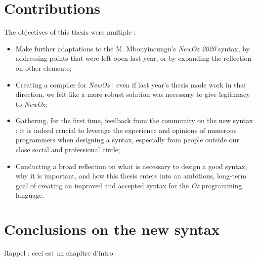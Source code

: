 \section{Contributions}\label{sec:ch1-3}
The objectives of this thesis were multiple :
\begin{itemize}
    \item Make further adaptations to the M. Mbonyincungu's \textit{NewOz 2020} syntax, by addressing points that were left open last year, or by expanding the reflection on other elements;
    \item Creating a compiler for \textit{NewOz} : even if last year's thesis made work in that direction, we felt like a more robust solution was necessary to give legitimacy to \textit{NewOz};
    \item Gathering, for the first time, feedback from the community on the new syntax : it is indeed crucial to leverage the experience and opinions of numerous programmers when designing a syntax, especially from people outside our close social and professional circle;
    \item Conducting a broad reflection on what is necessary to design a good syntax, why it is important, and how this thesis enters into an ambitious, long-term goal of creating an improved and accepted syntax for the \textit{Oz} programming language.
\end{itemize}

\section{Conclusions on the new syntax}\label{sec:ch1-4}
Rappel : ceci est un chapitre d'intro